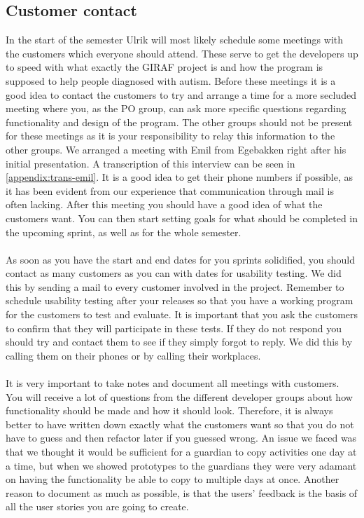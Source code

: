 \subsection{Customer contact}
In the start of the semester Ulrik will most likely schedule some meetings with the customers which everyone should attend.
These serve to get the developers up to speed with what exactly the GIRAF project is and how the program is supposed to help people diagnosed with autism.
Before these meetings it is a good idea to contact the customers to try and arrange a time for a more secluded meeting where you, as the PO group, can ask more specific questions regarding functionality and design of the program.
The other groups should not be present for these meetings as it is your responsibility to relay this information to the other groups.
We arranged a meeting with Emil from Egebakken right after his initial presentation. 
A transcription of this interview can be seen in \autoref{appendix:trans-emil}.
It is a good idea to get their phone numbers if possible, as it has been evident from our experience that communication through mail is often lacking.
After this meeting you should have a good idea of what the customers want.
You can then start setting goals for what should be completed in the upcoming sprint, as well as for the whole semester.
\\\\
As soon as you have the start and end dates for you sprints solidified, you should contact as many customers as you can with dates for usability testing. 
We did this by sending a mail to every customer involved in the project.
Remember to schedule usability testing after your releases so that you have a working program for the customers to test and evaluate.
It is important that you ask the customers to confirm that they will participate in these tests.
If they do not respond you should try and contact them to see if they simply forgot to reply.
We did this by calling them on their phones or by calling their workplaces.
\\\\
It is very important to take notes and document all meetings with customers.
You will receive a lot of questions from the different developer groups about how functionality should be made and how it should look.
Therefore, it is always better to have written down exactly what the customers want so that you do not have to guess and then refactor later if you guessed wrong.
An issue we faced was that we thought it would be sufficient for a guardian to copy activities one day at a time, but when we showed prototypes to the guardians they were very adamant on having the functionality be able to copy to multiple days at once.
Another reason to document as much as possible, is that the users' feedback is the basis of all the user stories you are going to create.

